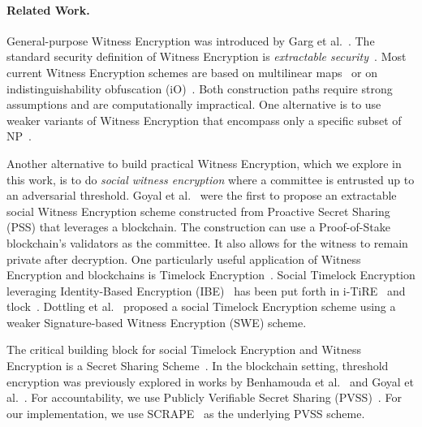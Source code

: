 \paragraph{Related Work.}
General-purpose Witness Encryption was introduced by Garg et al.~\cite{witness_encryption}.
The standard security definition of Witness Encryption is \emph{extractable security}~\cite{turing_machine_fe}.
Most current Witness Encryption schemes are based on multilinear maps~\cite{witness_encryption,we_multilinear_map} or on indistinguishability obfuscation (iO)~\cite{we_io}. Both construction paths require strong assumptions and are computationally impractical.
One alternative is to use weaker variants of Witness Encryption that encompass only a specific subset of \textsf{NP}~\cite{MrNISC}.

Another alternative to build practical Witness Encryption, which we explore in this work, is to do \emph{social witness encryption} where a committee is entrusted up to an adversarial threshold.
Goyal et al.~\cite{eweb} were the first to propose an extractable social Witness Encryption scheme constructed from Proactive Secret Sharing (PSS) that leverages a blockchain.
The construction can use a Proof-of-Stake blockchain's validators as the committee.
It also allows for the witness to remain private after decryption.
One particularly useful application of Witness Encryption and blockchains is Timelock Encryption~\cite{timelock_puzzles,timelock_from_crc,timed_release_cryptography}.
Social Timelock Encryption leveraging Identity-Based Encryption (IBE)~\cite{ibe} has been put forth in i-TiRE~\cite{i-TiRE} and tlock~\cite{tlock}.
Dottling et al.~\cite{mcfly} proposed a social Timelock Encryption scheme using a weaker Signature-based Witness Encryption (SWE) scheme.

The critical building block for social Timelock Encryption and Witness Encryption is a Secret Sharing Scheme~\cite{shamir_ss}. In the blockchain setting, threshold encryption was previously explored in works by Benhamouda et al.~\cite{benhamouda_ecpss} and Goyal et al.~\cite{eweb}.
For accountability, we use Publicly Verifiable Secret Sharing (PVSS)~\cite{first_pvss_chor,pvss_stadler}.
For our implementation, we use SCRAPE~\cite{pvss_scrape} as the underlying PVSS scheme.


